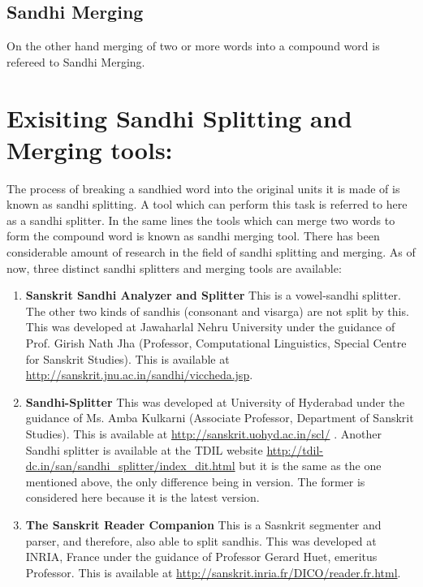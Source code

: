 \documentclass[11pt]{article}
\begin{document}
\subsection{Sandhi Merging}
On the other hand merging of two or more words into a compound word is refereed to Sandhi Merging.






\section{Exisiting Sandhi Splitting and Merging tools:}
The process of breaking a sandhied word into the original units it is made of is known as sandhi splitting. A tool which can perform this task is referred to here as a sandhi splitter.  In the same lines the tools which can merge two words to form the compound word is known as sandhi merging tool. 
There has been considerable amount of research in the field of sandhi splitting and merging. As of now, three distinct sandhi splitters and merging tools are available:
\begin{enumerate}
\item \textbf{Sanskrit Sandhi Analyzer and Splitter } This is a vowel-sandhi splitter. The other two kinds of sandhis (consonant and visarga) are not split by this. This was developed at Jawaharlal Nehru University under the guidance of Prof. Girish Nath Jha (Professor, Computational Linguistics, Special Centre for Sanskrit Studies). This is available at \url{http://sanskrit.jnu.ac.in/sandhi/viccheda.jsp}.
\item \textbf{Sandhi-Splitter} This was developed at University of Hyderabad under the guidance of Ms. Amba Kulkarni (Associate Professor, Department of Sanskrit Studies). This is available at \url{http://sanskrit.uohyd.ac.in/scl/}  . 
Another Sandhi splitter is available at the TDIL website 
\url{http://tdil-dc.in/san/sandhi_splitter/index_dit.html}  but it is the same as the one mentioned above, the only difference being in version. The former is considered here because it is the latest version.
\item \textbf{The Sanskrit Reader Companion } This is a Sasnkrit segmenter and parser, and therefore, also able to split sandhis. This was developed at INRIA, France under the guidance of Professor Gerard Huet, emeritus Professor. This is available at \url{http://sanskrit.inria.fr/DICO/reader.fr.html}.
\end{enumerate}
\end{document}
